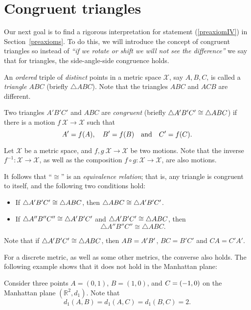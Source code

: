 \section{Congruent triangles}
\label{sec:cong-triangles}

Our next goal is to find a rigorous interpretation for statement (\ref{preaxiomIV}) in Section~\ref{preaxioms}.
To do this, we will introduce the concept of congruent triangles
so instead of \textit{``if we rotate or shift we will not see the difference''} we say that for triangles, the side-angle-side congruence holds.

An \textit{ordered} triple of \textit{distinct} points in a metric space $\mathcal{X}$, 
say $A,B,C$,
is called a \emph{triangle $ABC$}\label{page:def:triangle} (briefly $\triangle A B C$).
Note that the triangles $A B C$ and $A C B$ are different.

Two triangles $A' B' C'$ and $A B C$ are  
\emph{congruent}
(briefly  $\triangle A' B' C'\cong\triangle A B C$) if there is a motion $f\:\mathcal{X}\to\mathcal{X}$ such that 
\[A'=f(A),
\quad
B'=f(B)
\quad
\text{and}
\quad
C'=f(C).\]

Let $\mathcal X$ be a metric space,
and $f,g\:\mathcal X\to\mathcal X$ be two motions.
Note that the inverse $f^{-1}:\mathcal X\to\mathcal X$,
as well as the composition $f\circ g:\mathcal X\to\mathcal X$,
are also motions.

It follows that ``$\cong$'' is an \emph{equivalence relation};
that is, any triangle is congruent to itself, 
and the following two conditions hold:
\begin{itemize} 
\item If $\triangle A' B' C'\cong\triangle A B C$, then $\triangle A B C\cong\triangle A' B' C'$.
\item If $\triangle A'' B'' C''\cong\triangle A' B' C'$ and $\triangle A' B' C'\cong\triangle A B C$,
then 
$$\triangle A'' B'' C''\cong\triangle A B C.$$
\end{itemize}


Note that if $\triangle A' B' C'\cong\triangle A B C$,
then $AB=A'B'$,
$BC=B'C'$ and $CA=C'A'$.

For a discrete metric, as well as some other metrics, 
the converse also holds.
The following example shows that it does not hold in the Manhattan plane:

\label{example:isometric but not congruent} Consider three points 
$A=(0,1)$, $B=(1,0)$, and $C=(-1,0)$ on the Manhattan plane $(\mathbb{R}^2,d_1)$.
Note that
$$d_1(A,B)=d_1(A,C)=d_1(B,C)=2.$$

